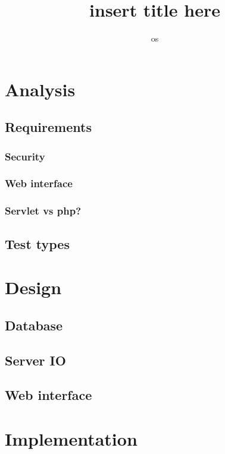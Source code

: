 

\title{insert title here}
\author{os}


\maketitle
\newpage
\tableofcontents



\chapter{Analysis}
  \section{Requirements}
    \subsection{Security}
    \subsection{Web interface}
    \subsection{Servlet vs php?}
  \section{Test types}

\chapter{Design}
  \section{Database}
  \section{Server IO}
  \section{Web interface}

\chapter{Implementation}
